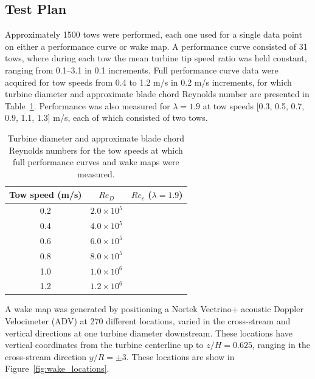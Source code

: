 \documentclass[energies,article,accept,moreauthors,pdftex,12pt,a4paper]{mdpi}
\begin{document}


\subsection{Test Plan} 

Approximately 1500 tows were performed, each one used for a single data point on
either a performance curve or wake map. A performance curve consisted of 31
tows, where during each tow the mean turbine tip speed ratio was held constant,
ranging from 0.1--3.1 in 0.1 increments. Full performance curve data were
acquired for tow speeds from 0.4 to 1.2 m/s in 0.2 m/s increments, for which
turbine diameter and approximate blade chord Reynolds number are presented in
Table~\ref{tab:Re}. Performance was also measured for $\lambda=1.9$ at tow
speeds [0.3, 0.5, 0.7, 0.9, 1.1, 1.3] m/s, each of which consisted of two tows.

\begin{table}
\centering
\begin{tabular}{ccc}
Tow speed (m/s) & $Re_D$ & $Re_c$ ($\lambda = 1.9$) \\ 
\hline
0.2 & $2.0 \times 10^5$ &  \\ 
0.4 & $4.0 \times 10^5$ &  \\ 
0.6 & $6.0 \times 10^5$ &  \\ 
0.8 & $8.0 \times 10^5$ &  \\ 
1.0 & $1.0 \times 10^6$ &  \\ 
1.2 & $1.2 \times 10^6$ &  \\ 
\end{tabular} 
\caption{Turbine diameter and approximate blade chord Reynolds numbers for the
tow speeds at which full performance curves and wake maps were measured.}
\label{tab:Re}
\end{table}

A wake map was generated by positioning a Nortek Vectrino+ acoustic Doppler
Velocimeter (ADV) at 270 different locations, varied in the cross-stream and
vertical directions at one turbine diameter downstream. These locations have
vertical coordinates from the turbine centerline up to $z/H=0.625$, ranging in
the cross-stream direction $y/R = \pm 3$. These locations are show in
Figure~\ref{fig:wake_locations}.
\end{document}
